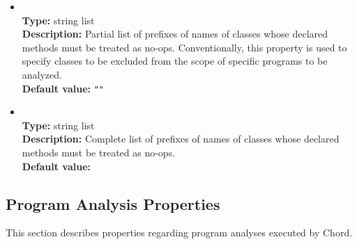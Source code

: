 \begin{itemize}
\item
{} \\
{\bf Type:} string list \\
{\bf Description:} Partial list of prefixes of names of classes whose declared methods must be treated as no-ops.  Conventionally, this property is used to specify classes to be
excluded from the scope of specific programs to be analyzed. \\
{\bf Default value:} {\tt ""}

\item
{} \\
{\bf Type:} string list \\
{\bf Description:} Complete list of prefixes of names of classes whose declared methods must be treated as no-ops. \\
{\bf Default value:} 
\end{itemize}

\subsection{Program Analysis Properties}

This section describes properties regarding program analyses executed by Chord.

